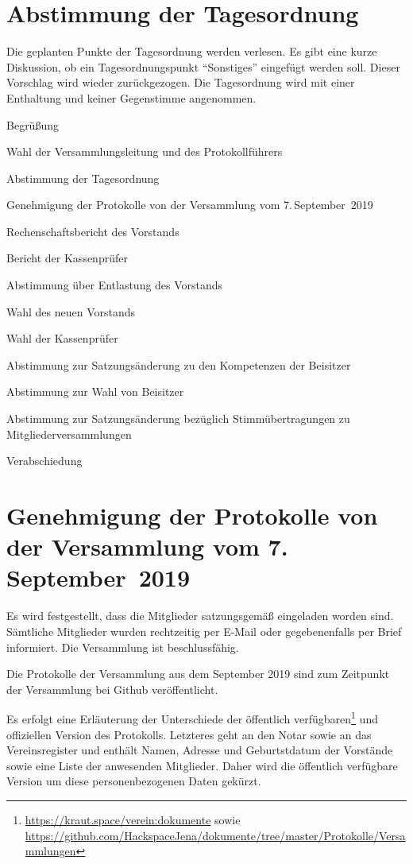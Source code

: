 \documentclass[DIV=calc,parksip=half*]{scrartcl}
\begin{document}
\section{Abstimmung der Tagesordnung}
Die geplanten Punkte der Tagesordnung werden verlesen. Es gibt eine kurze Diskussion, ob ein Tagesordnungspunkt \enquote{Sonstiges} eingefügt werden soll. Dieser Vorschlag wird wieder zurückgezogen. Die Tagesordnung wird mit einer Enthaltung und keiner Gegenstimme angenommen.
\begin{compactenum}
\item Begrüßung
\item Wahl der Versammlungsleitung und des Protokollführers
\item Abstimmung der Tagesordnung
\item  Genehmigung der Protokolle von der Versammlung vom 7.\,September~2019
\item  Rechenschaftsbericht des Vorstands
\item  Bericht der Kassenprüfer
\item Abstimmung über Entlastung des Vorstands
\item Wahl des neuen Vorstands
\item Wahl der Kassenprüfer
\item Abstimmung zur Satzungsänderung zu den Kompetenzen der Beisitzer
\item Abstimmung zur Wahl von Beisitzer
\item Abstimmung zur Satzungsänderung bezüglich Stimmübertragungen zu Mitgliederversammlungen
\item Verabschiedung
\end{compactenum}


\section{Genehmigung der Protokolle von der Versammlung vom 7.\,September~2019}


Es wird festgestellt, dass die Mitglieder satzungsgemäß eingeladen worden
sind. Sämtliche Mitglieder wurden rechtzeitig per E-Mail oder gegebenenfalls per
Brief informiert.  Die Versammlung ist beschlussfähig.

Die Protokolle der Versammlung aus dem September 2019 sind zum Zeitpunkt der
Versammlung bei Github veröffentlicht. 

Es erfolgt eine Erläuterung der Unterschiede der öffentlich verfügbaren\footnote{\url{https://kraut.space/verein:dokumente} sowie
\url{https://github.com/HackspaceJena/dokumente/tree/master/Protokolle/Versammlungen}} und offiziellen Version des Protokolls. Letzteres geht an den Notar sowie an das Vereinsregister und enthält Namen, Adresse und Geburtstdatum der Vorstände sowie eine Liste der anwesenden Mitglieder. Daher wird die öffentlich verfügbare Version um diese personenbezogenen Daten gekürzt.
\end{document}
